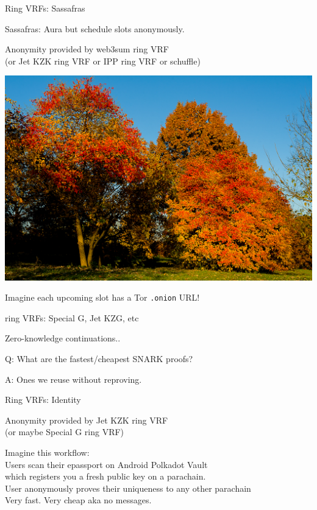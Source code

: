 \documentclass{beamer}
\begin{document}
\begin{frame}{Ring VRFs: Sassafras}

Sassafras:  Aura but schedule slots anonymously. \\ \medskip

Anonymity provided by web3sum ring VRF \\
\hspace{5pt}  (or Jet KZK ring VRF or IPP ring VRF or schuffle) \\ \medskip

\includegraphics[width=0.8 \textwidth]{../zksummit/Sassafras-albidum.jpg}

Imagine each upcoming slot has a Tor {\tt .onion} URL!

\end{frame}


\begin{frame}{ring VRFs: Special G, Jet KZG, etc}

Zero-knowledge continuations..

\bigskip
	
Q: What are the fastest/cheapest SNARK proofs?
	
\bigskip
	
A: Ones we reuse without reproving.
	
\end{frame}


\begin{frame}{Ring VRFs: Identity}

Anonymity provided by Jet KZK ring VRF \\
\hspace{5pt}  (or maybe Special G ring VRF) \\ \bigskip\bigskip

Imagine this workflow: \\ \medskip
\hspace{5pt} Users scan their epassport on Android Polkadot Vault \\
\hspace{10pt} which registers you a fresh public key on a parachain. \\ \medskip
\hspace{5pt} User anonymously proves their uniqueness to any other parachain \\
\hspace{10pt} Very fast.  Very cheap aka no messages.  \\

\end{frame}
\end{document}
